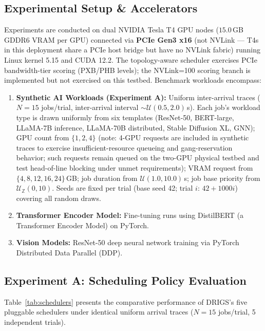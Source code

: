 \subsection{Experimental Setup \& Accelerators}
Experiments are conducted on dual NVIDIA Tesla T4 GPU nodes ($15.0$\,GB GDDR6 VRAM per GPU) connected via \textbf{PCIe Gen3 x16} (not NVLink — T4s in this deployment share a PCIe host bridge but have no NVLink fabric) running Linux kernel 5.15 and CUDA 12.2. The topology-aware scheduler exercises PCIe bandwidth-tier scoring (PXB/PHB levels); the NVLink=100 scoring branch is implemented but not exercised on this testbed. Benchmark workloads encompass:
\begin{enumerate}
    \item \textbf{Synthetic AI Workloads (Experiment A):} Uniform inter-arrival traces ($N=15$ jobs/trial, inter-arrival interval $\sim\mathcal{U}(0.5, 2.0)$\,s). Each job's workload type is drawn uniformly from six templates (ResNet-50, BERT-large, LLaMA-7B inference, LLaMA-70B distributed, Stable Diffusion XL, GNN); GPU count from $\{1,2,4\}$ (note: 4-GPU requests are included in synthetic traces to exercise insufficient-resource queueing and gang-reservation behavior; such requests remain queued on the two-GPU physical testbed and test head-of-line blocking under unmet requirements); VRAM request from $\{4,8,12,16,24\}$\,GB; job duration from $\mathcal{U}(1.0, 10.0)$\,s; job base priority from $\mathcal{U}_{\mathbb{Z}}(0, 10)$. Seeds are fixed per trial (base seed 42; trial $i$: $42 + 1000i$) covering all random draws.
    \item \textbf{Transformer Encoder Model:} Fine-tuning runs using DistilBERT (a Transformer Encoder Model) on PyTorch.
    \item \textbf{Vision Models:} ResNet-50 deep neural network training via PyTorch Distributed Data Parallel (DDP).
\end{enumerate}

\subsection{Experiment A: Scheduling Policy Evaluation}
Table~\ref{tab:schedulers} presents the comparative performance of DRIGS's five pluggable schedulers under identical uniform arrival traces ($N=15$ jobs/trial, 5 independent trials).


